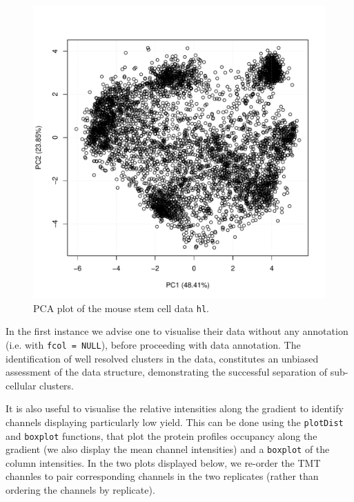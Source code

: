 \begin{figure}[!ht]
  \centering
\begin{knitrout}
\color{fgcolor}\begin{kframe}
\begin{alltt}
\hlstd{(}\hlstd{)}
  \hlstd{=} \hlstd{,}  \hlstd{=} \hlstd{)}
\end{alltt}
\end{kframe}
\includegraphics[width=.65\textwidth]{figure/qcplot-1} 

\end{knitrout}
  \caption{PCA plot of the mouse stem cell data \texttt{hl}.}
  \label{fig:pcahl}
\end{figure}

In the first instance we advise one to visualise their data without
any annotation (i.e. with \texttt{fcol = NULL}), before proceeding with data
annotation. The identification of well resolved clusters in the data,
constitutes an unbiased assessment of the data structure,
demonstrating the successful separation of sub-cellular clusters.

It is also useful to visualise the relative intensities along the
gradient to identify channels displaying particularly low yield. This
can be done using the \texttt{plotDist} and \texttt{boxplot} functions, that plot
the protein profiles occupancy along the gradient (we also display the
mean channel intensities) and a \texttt{boxplot} of the column intensities.
In the two plots displayed below, we re-order the TMT channles to pair
corresponding channels in the two replicates (rather than ordering
the channels by replicate).

